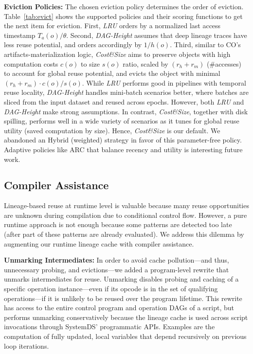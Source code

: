 \textbf{Eviction Policies:} The chosen eviction policy determines the order of eviction. Table~\ref{tab:evict} shows the supported policies and their scoring functions to get the next item for eviction. First, \emph{LRU} orders by a normalized last access timestamp $T_a(o)/\theta$. Second, \emph{DAG-Height} assumes that deep lineage traces have less reuse potential, and orders accordingly by $1/h(o)$. Third, similar to CO's \cite{DerakhshanMARM20} artifacts-materialization logic, \emph{Cost\&Size} aims to preserve objects with high computation costs $c(o)$ to size $s(o)$ ratio, scaled by $(r_h+r_m)$ (\#accesses) to account for global reuse potential, and evicts the object with minimal $(r_h+r_m)\cdot c(o)/s(o)$. While \emph{LRU} performs good in pipelines with temporal reuse locality, \emph{DAG-Height} handles mini-batch scenarios better, where batches are sliced from the input dataset and reused across epochs. However, both \emph{LRU} and \emph{DAG-Height} make strong assumptions. In contrast, \emph{Cost\&Size}, together with disk spilling, performs well in a wide variety of scenarios as it tunes for global reuse utility (saved computation by size). Hence, \emph{Cost\&Size} is our default. We abandoned an Hybrid (weighted) strategy in favor of this parameter-free policy. Adaptive policies like ARC \cite{MegiddoM03} that balance recency and utility is interesting future work.

\subsection{Compiler Assistance}
\label{sec:compassisted}

Lineage-based reuse at runtime level is valuable because many reuse opportunities are unknown during compilation due to conditional control flow. However, a pure runtime approach is not enough because some patterns are detected too late (after part of these patterns are already evaluated). We address this dilemma by augmenting our runtime lineage cache with compiler assistance.

\textbf{Unmarking Intermediates:} In order to avoid cache pollution---and thus, unnecessary probing, and evictions---we added a program-level rewrite that unmarks intermediates for reuse. Unmarking disables probing and caching of a specific operation instance---even if its opcode is in the set of qualifying operations---if it is unlikely to be reused over the program lifetime. This rewrite has access to the entire control program and operation DAGs of a script, but performs unmarking conservatively because the lineage cache is used across script invocations through SystemDS' programmatic APIs. Examples are the computation of fully updated, local variables that depend recursively on previous loop iterations.

